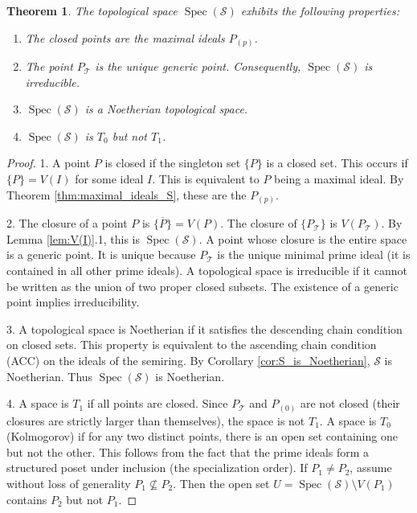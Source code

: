 \documentclass[11pt, a4paper]{article}
\theoremstyle{plain}
\newtheorem{theorem}{Theorem}[section]
\theoremstyle{definition}
\numberwithin{equation}{section}
\newcommand{\Tobj}{\mathcal{T}} %
\newcommand{\SemiringS}{\mathcal{S}}
\DeclareMathOperator{\Spec}{Spec}
\begin{document}
\begin{theorem}\label{thm:zariski_topology}
The topological space $\Spec(\SemiringS)$ exhibits the following properties:
\begin{enumerate}
    \item The closed points are the maximal ideals $P_{(p)}$.
    \item The point $P_{\Tobj}$ is the unique generic point. Consequently, $\Spec(\SemiringS)$ is irreducible.
    \item $\Spec(\SemiringS)$ is a Noetherian topological space.
    \item $\Spec(\SemiringS)$ is $T_0$ but not $T_1$.
\end{enumerate}
\end{theorem}
\begin{proof}
1. A point $P$ is closed if the singleton set $\{P\}$ is a closed set. This occurs if $\{P\}=V(I)$ for some ideal $I$. This is equivalent to $P$ being a maximal ideal. By Theorem \ref{thm:maximal_ideals_S}, these are the $P_{(p)}$.

2. The closure of a point $P$ is $\overline{\{P\}} = V(P)$. The closure of $\{P_{\Tobj}\}$ is $V(P_{\Tobj})$. By Lemma \ref{lem:V(I)}.1, this is $\Spec(\SemiringS)$. A point whose closure is the entire space is a generic point. It is unique because $P_{\Tobj}$ is the unique minimal prime ideal (it is contained in all other prime ideals). A topological space is irreducible if it cannot be written as the union of two proper closed subsets. The existence of a generic point implies irreducibility.

3. A topological space is Noetherian if it satisfies the descending chain condition on closed sets. This property is equivalent to the ascending chain condition (ACC) on the ideals of the semiring. By Corollary \ref{cor:S_is_Noetherian}, $\SemiringS$ is Noetherian. Thus $\Spec(\SemiringS)$ is Noetherian.

4. A space is $T_1$ if all points are closed. Since $P_{\Tobj}$ and $P_{(0)}$ are not closed (their closures are strictly larger than themselves), the space is not $T_1$.
A space is $T_0$ (Kolmogorov) if for any two distinct points, there is an open set containing one but not the other. This follows from the fact that the prime ideals form a structured poset under inclusion (the specialization order). If $P_1 \neq P_2$, assume without loss of generality $P_1 \not\subseteq P_2$. Then the open set $U = \Spec(\SemiringS) \setminus V(P_1)$ contains $P_2$ but not $P_1$.
\end{proof}
\end{document}
